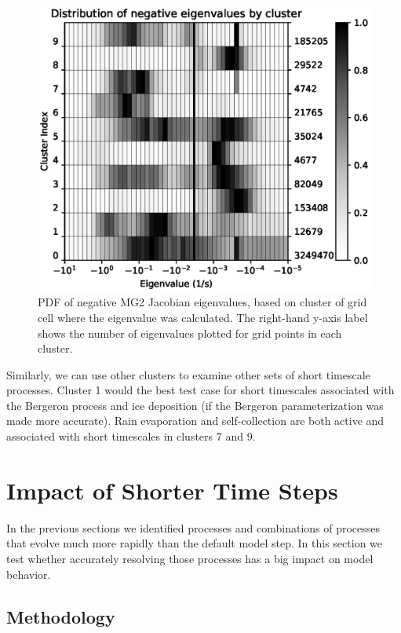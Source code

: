 \documentclass [11pt, proquest] {uwthesis}[2020/02/24]
\begin{document}
\begin{figure}[htbp]
  \includegraphics[width=6.5in]{./time_hist_cluster_2D_neg.eps}
  \caption[PDF of negative eigenvalues of the Jacobian of MG2, separated into clusters corresponding to different regimes]{PDF of negative MG2 Jacobian eigenvalues, based on cluster of grid cell where the eigenvalue was calculated. The right-hand y-axis label shows the number of eigenvalues plotted for grid points in each cluster.}
  \label{cluster-2D-neg-eig}
\end{figure}

Similarly, we can use other clusters to examine other sets of short timescale processes. Cluster 1 would the best test case for short timescales associated with the Bergeron process and ice deposition (if the Bergeron parameterization was made more accurate). Rain evaporation and self-collection are both active and associated with short timescales in clusters 7 and 9.

\section{Impact of Shorter Time Steps} \label{sec:MG2-impact}

In the previous sections we identified processes and combinations of processes that evolve much more rapidly than the default model step. In this section we test whether accurately resolving those processes has a big impact on model behavior.

\subsection{Methodology}
\end{document}
